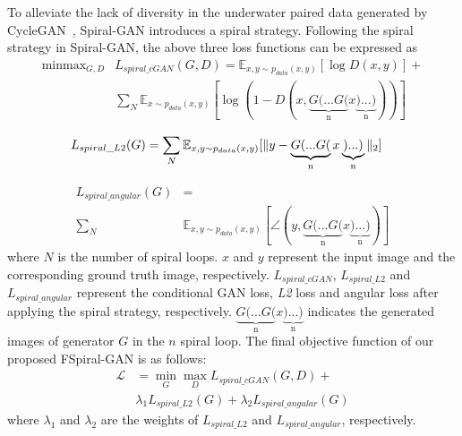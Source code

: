 \documentclass[utf8]{FrontiersinHarvard} %
\begin{document}
To alleviate the lack of diversity in the underwater paired data generated by CycleGAN~\citep{8237506}, Spiral-GAN introduces a spiral strategy. Following the spiral strategy in Spiral-GAN, the above three loss functions can be expressed as
\begin{equation}
\begin{aligned}
\mathop{\min \max}_{G,D}&L_{spiral\_cGAN}(G,D)=\mathbb{E}_{x,y\sim{p_{data}(x,y)}}[\log{D(x,y)}] +\\& \sum_N{\mathbb{E}_{x\sim{p_{data}(x,y)}}[\log(1-D(x, \underbrace{G(...G(}_{\text{n}}x\underbrace{)...)}_{\text{n}}))]}
\end{aligned}
\label{eq:spiral_cgan}
\end{equation}

\begin{equation}
\begin{aligned}
L_{spiral\_L2}(G)&=\sum_N{\mathbb{E}_{x,y\sim{p_{data}(x,y)}}[\Arrowvert y- \underbrace{G(...G(}_{\text{n}}x\underbrace{)...)}_{\text{n}}\Arrowvert_{2}]}
\end{aligned}
\label{eq:spiral_l2}
\end{equation}

\begin{equation}
\begin{aligned}
L_{spiral\_angular}(G)&=\\\sum_N&{\mathbb{E}_{x,y\sim{p_{data}(x,y)}}[\angle{(y,\underbrace{G(...G(}_{\text{n}}x\underbrace{)...)}_{\text{n}})}]}
\end{aligned}
\label{eq:sprial_angular}
\end{equation}
where $N$ is the number of spiral loops. $x$ and $y$ represent the input image and the corresponding ground truth image, respectively. $L_{spiral\_cGAN}$, $L_{spiral\_L2}$ and $L_{spiral\_angular}$ represent the conditional GAN loss, \textit{L2} loss and angular loss after applying the spiral strategy, respectively. $\underbrace{G(...G(}_{\text{n}}x\underbrace{)...)}_{\text{n}}$ indicates the generated images of generator $G$ in the $n$ spiral loop.
The final objective function of our proposed FSpiral-GAN is as follows:\begin{equation}
\begin{aligned}
\mathcal{L}&=\min_{G}\max_{D}L_{spiral\_cGAN}(G,D)+\\ & \lambda_{1}L_{spiral\_L2}(G)+ \lambda_{2}L_{spiral\_angular}(G)
\end{aligned}
\label{con:totalobjective}
\end{equation}
where $\lambda_{1}$ and $\lambda_{2}$ are the weights of $L_{spiral\_L2}$ and $L_{spiral\_angular}$, respectively.
\end{document}
